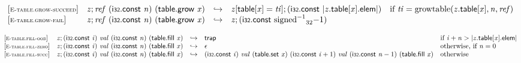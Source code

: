 \vspace{1ex}

$$
\begin{array}{@{}l@{}lcl@{}l@{}}
{[\textsc{\scriptsize E{-}table.grow{-}succeed}]} \quad & {\mathit{z}} ; {\mathit{ref}}~(\mathsf{i{\scriptstyle32}}.\mathsf{const}~{\mathit{n}})~(\mathsf{table.grow}~{\mathit{x}}) &\hookrightarrow& {\mathit{z}}{}[\mathsf{table}{}[{\mathit{x}}] = {\mathit{ti}}] ; (\mathsf{i{\scriptstyle32}}.\mathsf{const}~{|{{\mathit{z}}.\mathsf{table}}{{}[{\mathit{x}}]}.\mathsf{elem}|}) &\quad
  \mbox{if}~{\mathit{ti}} = {\mathrm{growtable}}({{\mathit{z}}.\mathsf{table}}{{}[{\mathit{x}}]}, {\mathit{n}}, {\mathit{ref}}) \\
{[\textsc{\scriptsize E{-}table.grow{-}fail}]} \quad & {\mathit{z}} ; {\mathit{ref}}~(\mathsf{i{\scriptstyle32}}.\mathsf{const}~{\mathit{n}})~(\mathsf{table.grow}~{\mathit{x}}) &\hookrightarrow& {\mathit{z}} ; (\mathsf{i{\scriptstyle32}}.\mathsf{const}~{{{{{\mathrm{signed}}^{{-1}}}}{}}_{32}}{{-1}}) &  \\
\end{array}
$$

\vspace{1ex}

$$
\begin{array}{@{}l@{}lcl@{}l@{}}
{[\textsc{\scriptsize E{-}table.fill{-}oob}]} \quad & {\mathit{z}} ; (\mathsf{i{\scriptstyle32}}.\mathsf{const}~{\mathit{i}})~{\mathit{val}}~(\mathsf{i{\scriptstyle32}}.\mathsf{const}~{\mathit{n}})~(\mathsf{table.fill}~{\mathit{x}}) &\hookrightarrow& \mathsf{trap} &\quad
  \mbox{if}~{\mathit{i}} + {\mathit{n}} > {|{{\mathit{z}}.\mathsf{table}}{{}[{\mathit{x}}]}.\mathsf{elem}|} \\
{[\textsc{\scriptsize E{-}table.fill{-}zero}]} \quad & {\mathit{z}} ; (\mathsf{i{\scriptstyle32}}.\mathsf{const}~{\mathit{i}})~{\mathit{val}}~(\mathsf{i{\scriptstyle32}}.\mathsf{const}~{\mathit{n}})~(\mathsf{table.fill}~{\mathit{x}}) &\hookrightarrow& \epsilon &\quad
  \mbox{otherwise, if}~{\mathit{n}} = 0 \\
{[\textsc{\scriptsize E{-}table.fill{-}succ}]} \quad & {\mathit{z}} ; (\mathsf{i{\scriptstyle32}}.\mathsf{const}~{\mathit{i}})~{\mathit{val}}~(\mathsf{i{\scriptstyle32}}.\mathsf{const}~{\mathit{n}})~(\mathsf{table.fill}~{\mathit{x}}) &\hookrightarrow& (\mathsf{i{\scriptstyle32}}.\mathsf{const}~{\mathit{i}})~{\mathit{val}}~(\mathsf{table.set}~{\mathit{x}})~(\mathsf{i{\scriptstyle32}}.\mathsf{const}~{\mathit{i}} + 1)~{\mathit{val}}~(\mathsf{i{\scriptstyle32}}.\mathsf{const}~{\mathit{n}} - 1)~(\mathsf{table.fill}~{\mathit{x}}) &\quad
  \mbox{otherwise} \\
\end{array}
$$

